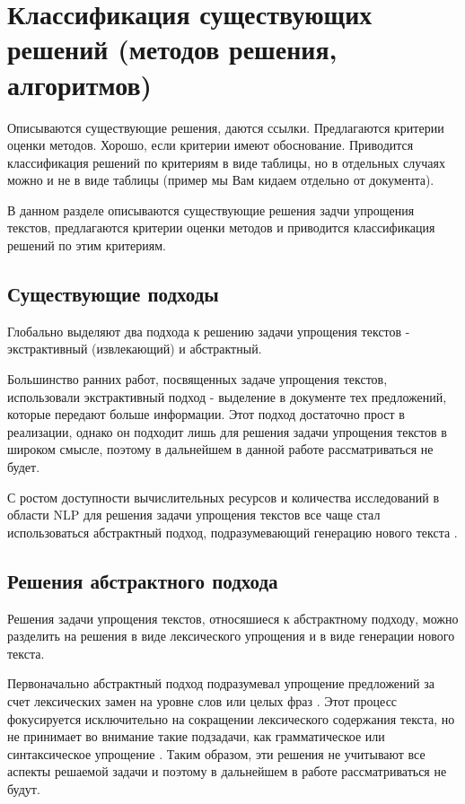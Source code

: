 \chapter{Классификация существующих решений (методов решения, алгоритмов)}

Описываются существующие решения, даются ссылки. Предлагаются критерии оценки методов. Хорошо, если критерии имеют обоснование. Приводится классификация решений по критериям в виде таблицы, но в отдельных случаях можно и не в виде таблицы (пример мы Вам кидаем отдельно от документа).

В данном разделе описываются существующие решения задчи упрощения текстов, предлагаются критерии оценки методов и приводится классификация решений по этим критериям.

\section{Существующие подходы}

Глобально выделяют два подхода к решению задачи упрощения текстов - экстрактивный (извлекающий) и абстрактный.

Большинство ранних работ, посвященных задаче упрощения текстов, использовали экстрактивный подход - выделение в документе тех предложений, которые передают больше информации. Этот подход достаточно прост в реализации, однако он подходит лишь для решения задачи упрощения текстов в широком смысле, поэтому в дальнейшем в данной работе рассматриваться не будет.

С ростом доступности вычислительных ресурсов и количества исследований в области NLP для решения задачи упрощения текстов все чаще стал использоваться абстрактный подход, подразумевающий генерацию нового текста \cite{see_get_2017}. 

\section{Решения абстрактного подхода}

Решения задачи упрощения текстов, относяшиеся к абстрактному подходу, можно разделить на решения в виде лексического упрощения и в виде генерации нового текста.

Первоначально абстрактный подход подразумевал упрощение предложений за счет лексических замен на уровне слов или целых фраз \cite{paetzold_survey_2017}. Этот процесс фокусируется исключительно на сокращении лексического содержания текста, но не принимает во внимание такие подзадачи, как грамматическое или синтаксическое упрощение \cite{shardlow_survey_2014}. Таким образом, эти решения не учитывают все аспекты решаемой задачи и поэтому в дальнейшем в работе рассматриваться не будут.

